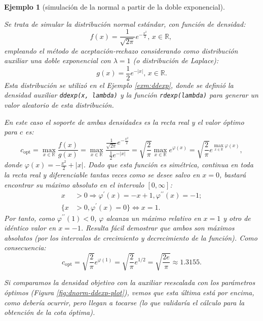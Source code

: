 \documentclass[
  spanish,
  10pt,
]{book}
\theoremstyle{break}
\newtheorem{example}{Ejemplo}[chapter]
\theoremstyle{nonumberplain}
\begin{document}
\begin{example}[simulación de la normal a partir de la doble exponencial]
\protect\hypertarget{exm:dnorm-ddexp-ar}{}\label{exm:dnorm-ddexp-ar}

Se trata de simular la distribución normal estándar, con función de densidad:
\[f(x)  =\frac{1}{\sqrt{2\pi}}e^{-\frac{x^{2}}{2}} \text{, } x\in\mathbb{R}\text{, }\]
empleando el método de aceptación-rechazo considerando como distribución auxiliar una doble exponencial con \(\lambda=1\) (o distribución de Laplace):
\[g(x)  =\frac{1}{2}e^{-\left| x \right|} \text{, } x\in\mathbb{R}.\]
Esta distribución se utilizó en el Ejemplo \ref{exm:ddexp}, donde se definió la densidad auxiliar \texttt{ddexp(x,\ lambda)} y la función \texttt{rdexp(lambda)} para generar un valor aleatorio de esta distribución.

En este caso el soporte de ambas densidades es la recta real y el valor óptimo para \(c\) es:
\[c_{\text{opt}} = \max_{x\in\mathbb{R}}\frac{f(x)}{g(x) } = \max_{x\in\mathbb{R}} \frac{\frac{1}{\sqrt{2\pi}}e^{-\frac{x^{2}}{2}}}{\frac{1}{2}e^{-\left| x\right|  }} = \sqrt{\frac{2}{\pi}}\max_{x\in\mathbb{R}}e^{\varphi(x)} = \sqrt{\frac{2}{\pi}}e^{\max_{x\in\mathbb{R}}\varphi(x)},\]
donde \(\varphi(x) = -\frac{x^{2}}{2}+\left| x \right|\).
Dado que esta función es simétrica, continua en toda la recta real y diferenciable tantas veces como se desee salvo en \(x=0\), bastará encontrar su máximo absoluto en el intervalo \([0,\infty]\):
\[\begin{aligned}
x  & >0\Rightarrow\varphi^{\prime}(x)  =-x+1,\varphi
^{\prime\prime}(x)  =-1;\\
\{x  & >0,\varphi^{\prime}(x)  =0\}\Leftrightarrow x=1.
\end{aligned}\]
Por tanto, como \(\varphi^{\prime\prime}(1) <0\), \(\varphi\) alcanza un máximo relativo en \(x=1\) y otro de idéntico valor en \(x=-1\).
Resulta fácil demostrar que ambos son máximos absolutos
(por los intervalos de crecimiento y decrecimiento de la función).
Como consecuencia:
\[c_{\text{opt}} = \sqrt{\frac{2}{\pi}}e^{\varphi(1)}
=\sqrt{\frac{2}{\pi}}e^{1/2} =\sqrt{\frac{2e}{\pi}} \approx 1.3155.\]

Si comparamos la densidad objetivo con la auxiliar reescalada con los parámetros óptimos (Figura \ref{fig:dnorm-ddexp-plot}), vemos que esta última está por encima, como debería ocurrir, pero llegan a tocarse (lo que validaría el cálculo para la obtención de la cota óptima).


\end{example}
\end{document}
